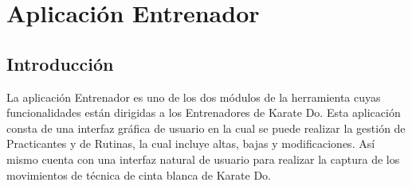 \section{Aplicación Entrenador}

\subsection{Introducción}
La aplicación Entrenador es uno de los dos módulos de la herramienta cuyas funcionalidades están dirigidas a los Entrenadores de Karate Do. Esta aplicación consta de una interfaz gráfica de usuario en la cual se puede realizar la gestión de Practicantes y de Rutinas, la cual incluye altas, bajas y modificaciones. Así mismo cuenta con una interfaz natural de usuario para realizar la captura de los movimientos de técnica de cinta blanca de Karate Do.





